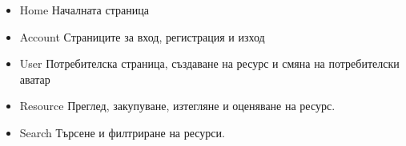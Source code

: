 \begin{itemize}
    \item Home
        Началната страница
    \item Account
        Страниците за вход, регистрация и изход
    \item User
        Потребителска страница, създаване на ресурс и
        смяна на потребителски аватар
    \item Resource
        Преглед, закупуване, изтегляне и оценяване на
        ресурс.
    \item Search
        Търсене и филтриране на ресурси.
\end{itemize}

